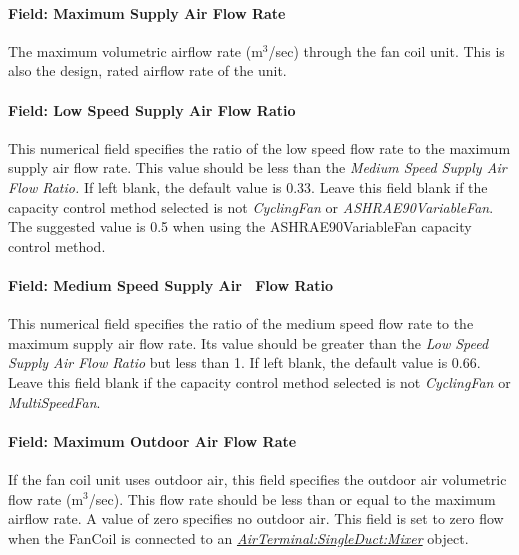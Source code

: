 \paragraph{Field: Maximum Supply Air Flow Rate}\label{field-maximum-supply-air-flow-rate}

The maximum volumetric airflow rate (m\(^{3}\)/sec) through the fan coil unit. This is also the design, rated airflow rate of the unit.

\paragraph{Field: Low Speed Supply Air Flow Ratio}\label{field-low-speed-supply-air-flow-ratio-000}

This numerical field specifies the ratio of the low speed flow rate to the maximum supply air flow rate. This value should be less than the \emph{Medium Speed Supply Air Flow Ratio.} If left blank, the default value is 0.33. Leave this field blank if the capacity control method selected is not \emph{CyclingFan} or \emph{ASHRAE90VariableFan}. The suggested value is 0.5 when using the ASHRAE90VariableFan capacity control method.

\paragraph{Field: Medium Speed Supply Air~ Flow Ratio}\label{field-medium-speed-supply-air-flow-ratio-000}

This numerical field specifies the ratio of the medium speed flow rate to the maximum supply air flow rate. Its value should be greater than the \emph{Low Speed Supply Air Flow Ratio} but less than 1. If left blank, the default value is 0.66. Leave this field blank if the capacity control method selected is not \emph{CyclingFan} or \emph{MultiSpeedFan}.

\paragraph{Field: Maximum Outdoor Air Flow Rate}\label{field-maximum-outdoor-air-flow-rate-002}

If the fan coil unit uses outdoor air, this field specifies the outdoor air volumetric flow rate (m\(^{3}\)/sec). This flow rate should be less than or equal to the maximum airflow rate. A value of zero specifies no outdoor air. This field is set to zero flow when the FanCoil is connected to an \textit{\hyperref[airterminalsingleductmixer]{AirTerminal:SingleDuct:Mixer}} object.

